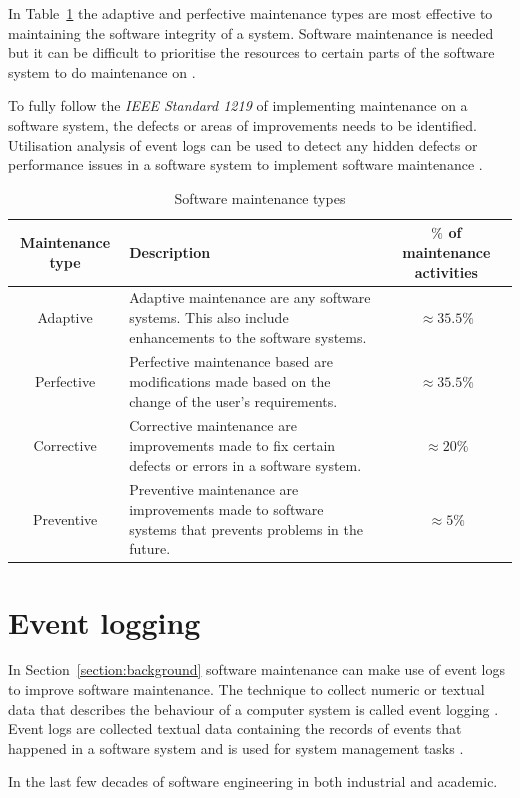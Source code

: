 In Table~\ref{tbl:CH1_MaintenanceTypes} the adaptive and perfective maintenance types are most effective to maintaining the software integrity of a system. Software maintenance is needed but it can be difficult to prioritise the resources to certain parts of the software system to do maintenance on \cite{Mamone1994, Hasan2012}.\par To fully follow the \textit{IEEE Standard 1219} of implementing maintenance on a software system, the defects or areas of improvements needs to be identified. Utilisation analysis of event logs can be used to detect any hidden defects or performance issues in a software system to implement software maintenance \cite{Cinque2013, Rong2018a, Levin2019}.

\clearpage

\begin{table}[!htb]
	\centering
	\small
	\caption{Software maintenance types}
	\label{tbl:CH1_MaintenanceTypes}
	\begin{tabularx}{\textwidth}{|c|X|c|}
		\hline
		\textbf{Maintenance type} & \textbf{Description} & \textbf{$\%$ of maintenance activities} \\ \hline
		Adaptive & \raggedright Adaptive maintenance are any software systems. This also include enhancements to the software systems. & $\approx 35.5\%$ \\ \hline
		Perfective & Perfective maintenance based are modifications made based on the change of the user's requirements. & $\approx 35.5\%$ \\ \hline
		Corrective & \raggedright Corrective maintenance are improvements made to fix certain defects or errors in a software system. & $\approx 20\%$ \\ \hline
		Preventive & \raggedright  Preventive maintenance are improvements made to software systems that prevents problems in the future. & $\approx 5\%$ \\ \hline
	\end{tabularx}
\end{table}

\section{Event logging}
In Section~\ref{section:background} software maintenance can make use of event logs to improve software maintenance. The technique to collect numeric or textual data that describes the behaviour of a computer system is called event logging \cite{Pecchia2015, Baccanico2014}. Event logs are collected textual data containing the records of events that happened in a software system and is used for system management tasks \cite{Rong2018a, Rong2018, Baccanico2014}.\par In the last few decades of software engineering in both industrial and academic.

